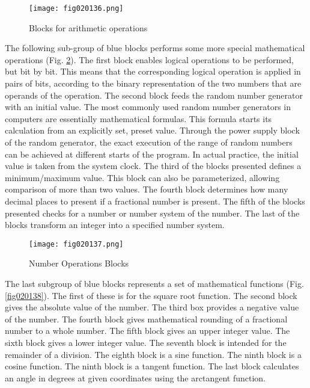 \begin{figure}[H]
   \centering
   \texttt{[image: fig020136.png]}
   \caption{Blocks for arithmetic operations}
\label{fig020136}
\end{figure}

The following sub-group of blue blocks performs some more special mathematical operations (Fig. \ref{fig020137}). The first block enables logical operations to be performed, but bit by bit. This means that the corresponding logical operation is applied in pairs of bits, according to the binary representation of the two numbers that are operands of the operation. The second block feeds the random number generator with an initial value. The most commonly used random number generators in computers are essentially mathematical formulas. This formula starts its calculation from an explicitly set, preset value. Through the power supply block of the random generator, the exact execution of the range of random numbers can be achieved at different starts of the program. In actual practice, the initial value is taken from the system clock. The third of the blocks presented defines a minimum/maximum value. This block can also be parameterized, allowing comparison of more than two values. The fourth block determines how many decimal places to present if a fractional number is present. The fifth of the blocks presented checks for a number or number system of the number. The last of the blocks transform an integer into a specified number system.

\begin{figure}[H]
   \centering
   \texttt{[image: fig020137.png]}
   \caption{Number Operations Blocks}
\label{fig020137}
\end{figure}

The last subgroup of blue blocks represents a set of mathematical functions (Fig. \ref{fig020138}). The first of these is for the square root function. The second block gives the absolute value of the number. The third box provides a negative value of the number. The fourth block gives mathematical rounding of a fractional number to a whole number. The fifth block gives an upper integer value. The sixth block gives a lower integer value. The seventh block is intended for the remainder of a division. The eighth block is a sine function. The ninth block is a cosine function. The ninth block is a tangent function. The last block calculates an angle in degrees at given coordinates using the arctangent function.

